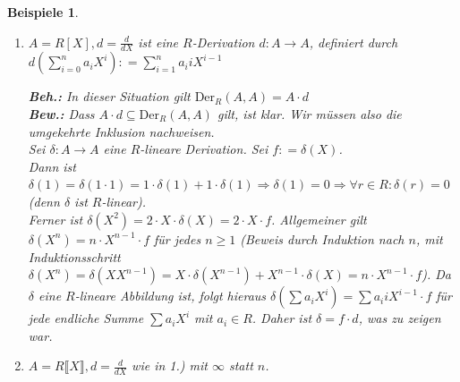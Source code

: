 \documentclass[a4paper,12pt]{scrbook}
\theoremstyle{break}
\theoremstyle{nonumberbreak}
\newtheorem{nnBsp}{Beispiele}
\theoremstyle{nonumberplain}
\newcommand{\defeqr}[0]{\mathrel{\mathop:}=}
\begin{document}
\begin{nnBsp}
  \begin{enumerate}
  \item[1.)] $A = R[X], d = \frac{d}{dX}$ ist eine $R$-Derivation $d: A \to
    A$, definiert durch $d(\sum_{i=0}^n a_i X^i) \defeqr \sum_{i=1}^n a_i
    i X^{i-1}$
    
    \textbf{Beh.:} In dieser Situation gilt $\mbox{Der}_R(A,A) = A \cdot d$ \\
    \textbf{Bew.:} Dass $A \cdot d \subseteq \mbox{Der}_R(A,A)$ gilt, ist klar. Wir müssen
    also die umgekehrte Inklusion nachweisen.\\
    Sei $\delta: A \to A$ eine $R$-lineare Derivation. Sei $f \defeqr \delta(X)$. \\
    Dann ist $\delta(1) = \delta(1 \cdot 1) =1 \cdot \delta(1) + 1
    \cdot \delta(1) \Rightarrow \delta(1) = 0
    \Rightarrow \forall r \in R:\delta(r) = 0$ (denn $\delta$ ist $R$-linear).\\
    Ferner ist $\delta(X^2) = 2 \cdot X \cdot \delta(X) = 2 \cdot X \cdot f$. Allgemeiner gilt
    $\delta(X^n) = n \cdot X^{n-1} \cdot f$ für jedes $n \geq 1$ (Beweis durch Induktion nach
    $n$, mit Induktionsschritt $\delta(X^n) = \delta\left(XX^{n-1}\right) = X
    \cdot \delta(X^{n-1}) + X^{n-1} \cdot \delta(X) = n \cdot X^{n-1}\cdot f$).
    Da $\delta$ eine $R$-lineare Abbildung ist, folgt hieraus
    $ \delta(\sum a_i X^i) = \sum a_i i X^{i-1} \cdot f$ für jede endliche Summe $\sum a_i X^i$
    mit $a_i \in R$. Daher ist $\delta = f \cdot d$, was zu zeigen war.
    
  \item[2.)] $A = R \llbracket X \rrbracket, d = \frac{d}{dX}$ wie in 1.) mit
    $\infty$ statt $n$.


\end{enumerate}
\end{nnBsp}
\end{document}
